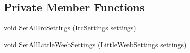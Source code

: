 \subsection*{Private Member Functions}
\begin{DoxyCompactItemize}
\item 
void \mbox{\hyperlink{class_little_weeb_library_1_1_services_1_1_settings_web_socket_service_a6eba1d3b176e627d3dae57070e1c3beb}{Set\+All\+Irc\+Settings}} (\mbox{\hyperlink{class_little_weeb_library_1_1_settings_1_1_irc_settings}{Irc\+Settings}} settings)
\item 
void \mbox{\hyperlink{class_little_weeb_library_1_1_services_1_1_settings_web_socket_service_a5ae643bad024f7eca3178d5359886f6f}{Set\+All\+Little\+Weeb\+Settings}} (\mbox{\hyperlink{class_little_weeb_library_1_1_settings_1_1_little_weeb_settings}{Little\+Weeb\+Settings}} settings)
\end{DoxyCompactItemize}
